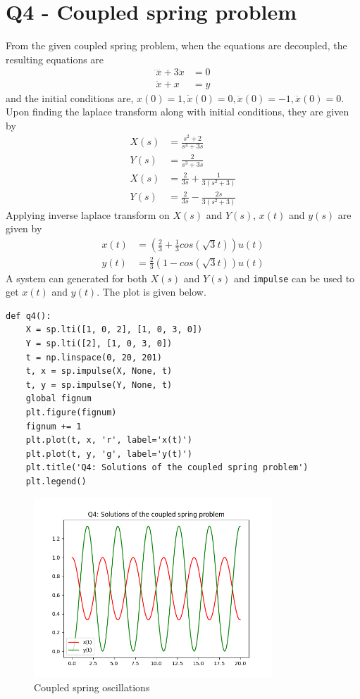 \documentclass[12pt, a4paper]{article}
\begin{document}
\section{Q4 - Coupled spring problem}

From the given coupled spring problem, when the equations are decoupled, the resulting equations are
\begin{align*}
\ddddot{x} + 3\ddot{x} &= 0 \\
\ddot{x} + x &= y
\end{align*}
and the initial conditions are, $x(0) = 1, \dot{x}(0) = 0, \ddot{x}(0) = -1, \dddot{x}(0) = 0$. Upon finding the laplace transform along with initial conditions, they are given by
\begin{align*}
X(s) &= \frac{s^2 + 2}{s^3 + 3s} \\
Y(s) &= \frac{2}{s^3 + 3s}\\
X(s) &= \frac{2}{3s}+\frac{1}{3(s^2 +3)} \\
Y(s) &= \frac{2}{3s} - \frac{2s}{3(s^2+3)}
\end{align*}
Applying inverse laplace transform on $X(s)$ and $Y(s)$, $x(t)$ and $y(s)$ are given by
\begin{align*}
x(t) &= (\frac{2}{3} + \frac{1}{3}cos(\sqrt{3}t))u(t) \\
y(t) &= \frac{2}{3}(1-cos(\sqrt{3}t))u(t)
\end{align*}
A system can generated for both $X(s)$ and $Y(s)$ and \texttt{impulse} can be used to get $x(t)$ and $y(t)$. The plot is given below.
\begin{lstlisting}
def q4():
    X = sp.lti([1, 0, 2], [1, 0, 3, 0])
    Y = sp.lti([2], [1, 0, 3, 0])
    t = np.linspace(0, 20, 201)
    t, x = sp.impulse(X, None, t)
    t, y = sp.impulse(Y, None, t)
    global fignum
    plt.figure(fignum)
    fignum += 1
    plt.plot(t, x, 'r', label='x(t)')
    plt.plot(t, y, 'g', label='y(t)')
    plt.title('Q4: Solutions of the coupled spring problem')
    plt.legend()
\end{lstlisting}
\begin{figure}[H]
\centering
\includegraphics[width=0.8\textwidth]{Figure_8.png}
\caption{Coupled spring oscillations}
\end{figure}
\end{document}
